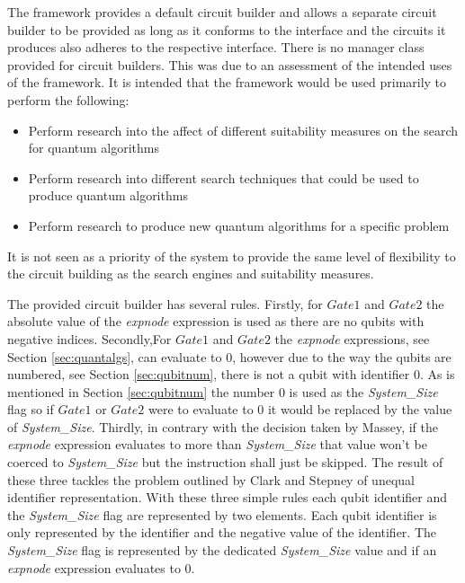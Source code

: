 The framework provides a default circuit builder and allows a separate circuit builder to be provided as long as it conforms to the interface and the circuits it produces also adheres to the respective interface.
There is no manager class provided for circuit builders.
This was due to an assessment of the intended uses of the framework.
It is intended that the framework would be used primarily to perform the following:
\begin{itemize}
  \item Perform research into the affect of different suitability measures on the search for quantum algorithms
  \item Perform research into different search techniques that could be used to produce quantum algorithms
  \item Perform research to produce new quantum algorithms for a specific problem
\end{itemize}

It is not seen as a priority of the system to provide the same level of flexibility to the circuit building as the search engines and suitability measures.

The provided circuit builder has several rules.
Firstly, for $Gate1$ and $Gate2$ the absolute value of the \emph{expnode} expression is used as there are no qubits with negative indices.
Secondly,For $Gate1$ and $Gate2$ the \emph{expnode} expressions, see Section \ref{sec:quantalgs}, can evaluate to $0$, however due to the way the qubits are numbered, see Section \ref{sec:qubitnum}, there is not a qubit with identifier $0$.
As is mentioned in Section \ref{sec:qubitnum} the number $0$ is used as the \emph{System\_Size} flag so if $Gate1$ or $Gate2$ were to evaluate to $0$ it would be replaced by the value of \emph{System\_Size}.
Thirdly, in contrary with the decision taken by Massey\cite{masseythesis}, if the \emph{expnode} expression evaluates to more than \emph{System\_Size} that value won't be coerced to \emph{System\_Size} but the instruction shall just be skipped.
The result of these three tackles the problem outlined by Clark and Stepney\cite{Stepney07searchingfor} of unequal identifier representation.
With these three simple rules each qubit identifier and the \emph{System\_Size} flag are represented by two elements.
Each qubit identifier is only represented by the identifier and the negative value of the identifier.
The \emph{System\_Size} flag is represented by the dedicated \emph{System\_Size} value and if an \emph{expnode} expression evaluates to $0$.

